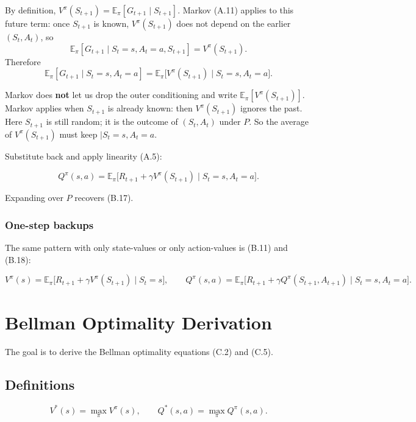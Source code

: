 By definition, $V^\pi(S_{t+1})=\mathbb{E}_\pi[G_{t+1}\mid S_{t+1}]$. Markov (A.11) applies to this future term: once $S_{t+1}$ is known, $V^\pi(S_{t+1})$ does not depend on the earlier $(S_t,A_t)$, so \[
\mathbb{E}_\pi[G_{t+1}\mid S_t=s,A_t=a,S_{t+1}]
=
V^\pi(S_{t+1}).
\] Therefore \[
\mathbb{E}_\pi[G_{t+1}\mid S_t=s,A_t=a]
=
\mathbb{E}_\pi\bigl[V^\pi(S_{t+1})\mid S_t=s,A_t=a\bigr].
\]

Markov does \textbf{not} let us drop the outer conditioning and write $\mathbb{E}_\pi[V^\pi(S_{t+1})]$. Markov applies when $S_{t+1}$ is already known: then $V^\pi(S_{t+1})$ ignores the past. Here $S_{t+1}$ is still random; it is the outcome of $(S_t,A_t)$ under $P$. So the average of $V^\pi(S_{t+1})$ must keep $|S_t=s,A_t=a$.

Substitute back and apply linearity (A.5):

\begin{equation}
Q^\pi(s,a)
=
\mathbb{E}_\pi\bigl[R_{t+1}+\gamma V^\pi(S_{t+1})\mid S_t=s,A_t=a\bigr].
\tag{B.20}
\end{equation}

Expanding over $P$ recovers (B.17).

\subsection{One-step backups}

The same pattern with only state-values or only action-values is (B.11) and (B.18):

\begin{equation}
V^\pi(s)
=
\mathbb{E}_\pi\bigl[R_{t+1}+\gamma V^\pi(S_{t+1})\mid S_t=s\bigr],
\qquad
Q^\pi(s,a)
=
\mathbb{E}_\pi\bigl[R_{t+1}+\gamma Q^\pi(S_{t+1},A_{t+1})\mid S_t=s,A_t=a\bigr].
\tag{B.21}
\end{equation}

\chapter{Bellman Optimality Derivation}\label{app:C}

The goal is to derive the Bellman optimality equations (C.2) and (C.5).

\section{Definitions}

\begin{equation}
V^*(s) = \max_\pi V^\pi(s),
\qquad
Q^*(s,a) = \max_\pi Q^\pi(s,a).
\tag{C.1}
\end{equation}

